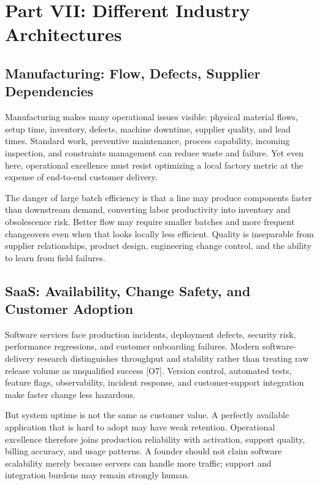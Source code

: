 \section*{Part VII: Different Industry Architectures}

\subsection{Manufacturing: Flow, Defects, Supplier Dependencies}
\label{sec:arch_manufacturing}

Manufacturing makes many operational issues visible: physical material flows, setup time, inventory, defects, machine downtime, supplier quality, and lead times. Standard work, preventive maintenance, process capability, incoming inspection, and constraints management can reduce waste and failure. Yet even here, operational excellence must resist optimizing a local factory metric at the expense of end-to-end customer delivery.

The danger of large batch efficiency is that a line may produce components faster than downstream demand, converting labor productivity into inventory and obsolescence risk. Better flow may require smaller batches and more frequent changeovers even when that looks locally less efficient. Quality is inseparable from supplier relationships, product design, engineering change control, and the ability to learn from field failures.

\subsection{SaaS: Availability, Change Safety, and Customer Adoption}
\label{sec:arch_saas}

Software services face production incidents, deployment defects, security risk, performance regressions, and customer onboarding failures. Modern software-delivery research distinguishes throughput and stability rather than treating raw release volume as unqualified success [O7]. Version control, automated tests, feature flags, observability, incident response, and customer-support integration make faster change less hazardous.

But system uptime is not the same as customer value. A perfectly available application that is hard to adopt may have weak retention. Operational excellence therefore joins production reliability with activation, support quality, billing accuracy, and usage patterns. A founder should not claim software scalability merely because servers can handle more traffic; support and integration burdens may remain strongly human.

